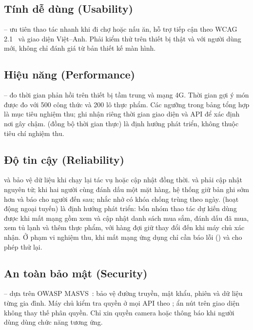 \subsection{Tính dễ dùng (Usability)}\label{ssec:nfr-de-dung}

-- ưu tiên thao tác nhanh khi đi chợ hoặc nấu ăn, hỗ trợ tiếp cận theo WCAG 2.1~\cite{wcag21} và giao diện Việt--Anh. Phải kiểm thử trên thiết bị thật và với người dùng mới, không chỉ đánh giá từ bản thiết kế màn hình.

\subsection{Hiệu năng (Performance)}\label{ssec:nfr-hieu-nang}

-- đo thời gian phản hồi trên thiết bị tầm trung và mạng 4G. Thời gian gợi ý món được đo với 500 công thức và 200 lô thực phẩm. Các ngưỡng trong bảng tổng hợp là mục tiêu nghiệm thu; ghi nhận riêng thời gian giao diện và API để xác định nơi gây chậm.  (đồng bộ thời gian thực) là định hướng phát triển, không thuộc tiêu chí nghiệm thu.

\subsection{Độ tin cậy (Reliability)}\label{ssec:nfr-tin-cay}

 và  bảo vệ dữ liệu khi chạy lại tác vụ hoặc cập nhật đồng thời.  và  phải cập nhật nguyên tử; khi hai người cùng đánh dấu một mặt hàng, hệ thống giữ bản ghi sớm hơn và báo cho người đến sau; nhắc nhở có khóa chống trùng theo ngày.  (hoạt động ngoại tuyến) là định hướng phát triển: bốn nhóm thao tác dự kiến dùng được khi mất mạng gồm xem và cập nhật danh sách mua sắm, đánh dấu đã mua, xem tủ lạnh và thêm thực phẩm, với hàng đợi giữ thay đổi đến khi máy chủ xác nhận. Ở phạm vi nghiệm thu, khi mất mạng ứng dụng chỉ cần báo lỗi () và cho phép thử lại.

\subsection{An toàn bảo mật (Security)}\label{ssec:nfr-bao-mat}

-- dựa trên OWASP MASVS~\cite{masvs}: bảo vệ đường truyền, mật khẩu, phiên và dữ liệu từng gia đình. Máy chủ kiểm tra quyền ở mọi API theo ; ẩn nút trên giao diện không thay thế phân quyền. Chỉ xin quyền camera hoặc thông báo khi người dùng dùng chức năng tương ứng.

